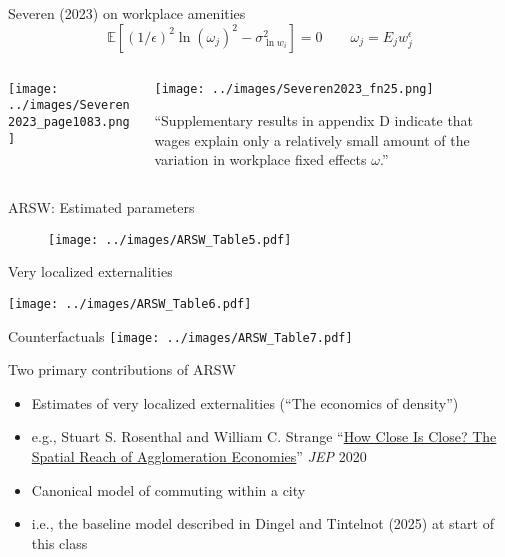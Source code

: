 \documentclass[11pt,notes=hide,aspectratio=169]{beamer}
\begin{document}
\begin{frame}{Severen (2023) on workplace amenities}
\begin{equation*}
\mathbb{E} \left[ \left( 1/\epsilon \right)^{2} \ln \left( \omega_{j} \right)^{2} - \sigma_{\ln w_{i}}^{2} \right] = 0
\qquad
\omega_{j} = E_j w_{j}^{\epsilon}
\end{equation*}
\begin{columns}
\begin{column}{0.49\textwidth}
\texttt{[image: ../images/Severen2023\_page1083.png]}
\end{column}
\begin{column}{0.49\textwidth}
\texttt{[image: ../images/Severen2023\_fn25.png]}\\
{\footnotesize ``Supplementary results in appendix D indicate that wages explain only a relatively small amount of the variation in workplace fixed effects $\omega$.''\par}
\end{column}
\end{columns}
\end{frame}
\begin{frame}{ARSW: Estimated parameters}
\begin{figure}
\centering
\texttt{[image: ../images/ARSW\_Table5.pdf]}
\end{figure}
\end{frame}
\begin{frame}{Very localized externalities}
\begin{center}
\texttt{[image: ../images/ARSW\_Table6.pdf]}
\end{center}
\end{frame}
\begin{frame}{Counterfactuals}
\texttt{[image: ../images/ARSW\_Table7.pdf]}
\end{frame}
\begin{frame}{Two primary contributions of ARSW}
\begin{itemize}
\item Estimates of very localized externalities (``The economics of density'')
\item[] e.g., Stuart S. Rosenthal and William C. Strange ``\href{https://www.aeaweb.org/articles?id=10.1257/jep.34.3.27}{How Close Is Close? The Spatial Reach of Agglomeration Economies}'' \textit{JEP} 2020
\item Canonical model of commuting within a city
\item[] i.e., the baseline model described in Dingel and Tintelnot (2025) at start of this class
\end{itemize}
\end{frame}
\end{document}
